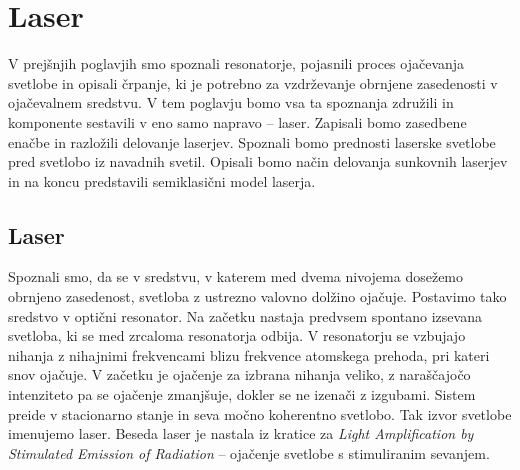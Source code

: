 \chapter{Laser}

V prejšnjih poglavjih smo spoznali resonatorje, pojasnili proces ojačevanja svetlobe in 
opisali črpanje, ki je potrebno za vzdrževanje obrnjene zasedenosti v ojačevalnem sredstvu. 
V tem poglavju bomo vsa ta
spoznanja združili in komponente sestavili v eno samo napravo -- laser. Zapisali
bomo zasedbene enačbe in razložili delovanje laserjev. Spoznali bomo prednosti 
laserske svetlobe pred svetlobo iz navadnih svetil. Opisali bomo način delovanja 
sunkovnih laserjev in na koncu predstavili semiklasični model laserja. 

\section{Laser}
Spoznali smo, da se v sredstvu, v katerem med dvema nivojema dosežemo obrnjeno 
zasedenost, svetloba z ustrezno valovno dolžino ojačuje. 
Postavimo tako sredstvo v optični resonator.  
Na začetku nastaja predvsem spontano izsevana svetloba, ki 
 se med zrcaloma resonatorja odbija.
V resonatorju se vzbujajo nihanja z nihajnimi frekvencami blizu frekvence
atomskega prehoda, pri kateri snov ojačuje. V začetku je ojačenje za
izbrana nihanja veliko, z naraščajočo intenziteto pa se ojačenje zmanjšuje, 
dokler se ne izenači z izgubami. 
Sistem preide v stacionarno stanje in seva močno koherentno svetlobo. Tak
izvor svetlobe imenujemo laser. Beseda laser je nastala iz kratice za {\it Light
Amplification by Stimulated Emission of Radiation} --  ojačenje svetlobe s
stimuliranim sevanjem.

